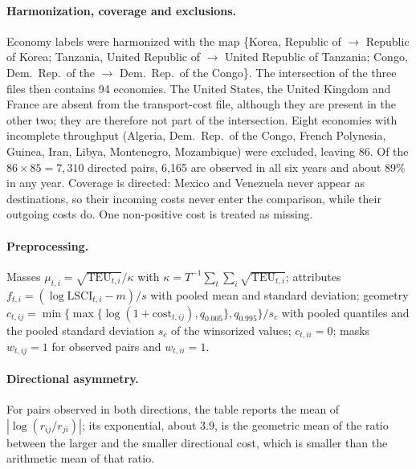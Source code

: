 \documentclass[12pt]{article}
\begin{document}
\paragraph{Harmonization, coverage and exclusions.} Economy labels were harmonized with the map \{Korea, Republic of $\to$ Republic of Korea; Tanzania, United Republic of $\to$ United Republic of Tanzania; Congo, Dem.\ Rep.\ of the $\to$ Dem.\ Rep.\ of the Congo\}. The intersection of the three files then contains 94 economies. The United States, the United Kingdom and France are absent from the transport-cost file, although they are present in the other two; they are therefore not part of the intersection. Eight economies with incomplete throughput (Algeria, Dem.\ Rep.\ of the Congo, French Polynesia, Guinea, Iran, Libya, Montenegro, Mozambique) were excluded, leaving 86. Of the $86\times85=7{,}310$ directed pairs, 6{,}165 are observed in all six years and about 89\% in any year. Coverage is directed: Mexico and Venezuela never appear as destinations, so their incoming costs never enter the comparison, while their outgoing costs do. One non-positive cost is treated as missing.

\paragraph{Preprocessing.} Masses $\mu_{t,i}=\sqrt{\mathrm{TEU}_{t,i}}/\kappa$ with $\kappa=T^{-1}\sum_t\sum_i\sqrt{\mathrm{TEU}_{t,i}}$; attributes $f_{t,i}=(\log\mathrm{LSCI}_{t,i}-m)/s$ with pooled mean and standard deviation; geometry $c_{t,ij}=\min\{\max\{\log(1+\mathrm{cost}_{t,ij}),q_{0.005}\},q_{0.995}\}/s_c$ with pooled quantiles and the pooled standard deviation $s_c$ of the winsorized values; $c_{t,ii}=0$; masks $w_{t,ij}=1$ for observed pairs and $w_{t,ii}=1$.

\paragraph{Directional asymmetry.} For pairs observed in both directions, the table reports the mean of $|\log(r_{ij}/r_{ji})|$; its exponential, about $3.9$, is the geometric mean of the ratio between the larger and the smaller directional cost, which is smaller than the arithmetic mean of that ratio.
\end{document}
